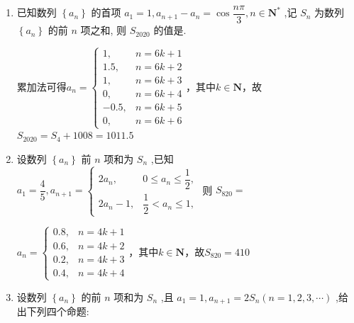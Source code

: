 \begin{enumerate}
\begin{jieda}
        因此$\dfrac{1}{a_n} = n(n+1)$，$S_n = \left[\dfrac{n(n+1)(2n+1)}{6}\right]+ \left[\dfrac{n(n+1)}{2}\right]$，$S_{18} = 2280, S_{17} = 1938$故大于 2020 的最小项是第18项.
    \end{jieda}
    \item 已知数列 $\left\{  {a}_{n}\right\}$ 的首项 ${a}_{1} = 1,{a}_{n + 1} - {a}_{n} = \cos \dfrac{n\pi }{3},n \in  {\mathbf{N}}^{ * }$ ,记 ${S}_{n}$ 为数列 $\left\{  {a}_{n}\right\}$ 的前 $n$ 项之和, 则 ${S}_{2020}$ 的值是.
    \begin{jieda}
        累加法可得$a_n = \left\{\begin{array}{ll}
             1, & n = 6k+1 \\
             1.5, & n = 6k+2 \\
             1, & n = 6k+3 \\
             0, & n = 6k+4 \\
             -0.5, & n = 6k+5 \\
             0, & n = 6k + 6
        \end{array}\right.$，其中$k \in \mathbf{N}$，故$S_{2020} = S_4+1008=1011.5$
    \end{jieda}
    \item 设数列 $\left\{  {a}_{n}\right\}$ 前 $n$ 项和为 ${S}_{n}$ ,已知 ${a}_{1} = \dfrac{4}{5},{a}_{n + 1} = \left\{  \begin{array}{ll} 2{a}_{n}, & 0 \leq  {a}_{n} \leq  \dfrac{1}{2}, \\  2{a}_{n} - 1, & \dfrac{1}{2} < {a}_{n} \leq  1, \end{array}\right.$ 则 ${S}_{820} =$
    \begin{jieda}
        $a_n = \left\{\begin{array}{ll}
             0.8, & n = 4k+1 \\
             0.6, & n = 4k+2 \\
             0.2, & n = 4k+3 \\
             0.4, & n = 4k+4 
        \end{array}\right.$，其中$k \in \mathbf{N}$，故$S_{820} = 410$
    \end{jieda}
    \item 设数列 $\left\{  {a}_{n}\right\}$ 的前 $n$ 项和为 ${S}_{n}$ ,且 ${a}_{1} = 1,{a}_{n + 1} = 2{S}_{n}\left( {n = 1,2,3,\cdots }\right)$ ,给出下列四个命题:
\end{enumerate}
